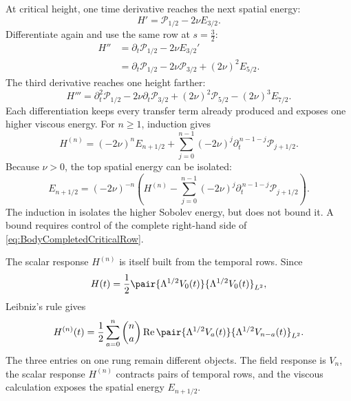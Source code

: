 At critical height, one time derivative reaches the next spatial energy:
\[
  H'=\mathcal P_{1/2}-2\nu E_{3/2}.
\]
Differentiate again and use the same row at \(s=\tfrac32\):
\[
\begin{aligned}
  H''
  &=\partial_t\mathcal P_{1/2}-2\nu E_{3/2}'
  \\
  &=\partial_t\mathcal P_{1/2}
  -2\nu\mathcal P_{3/2}
  +(2\nu)^2E_{5/2}.
\end{aligned}
\]
The third derivative reaches one height farther:
\[
  H'''
  =\partial_t^2\mathcal P_{1/2}
  -2\nu\partial_t\mathcal P_{3/2}
  +(2\nu)^2\mathcal P_{5/2}
  -(2\nu)^3E_{7/2}.
\]
Each differentiation keeps every transfer term already produced and exposes one higher viscous energy.
For \(n\geq1\), induction gives
\begin{equation}\label{eq:BodyCriticalHeightSpatialAscent}
  H^{(n)}
  =(-2\nu)^nE_{n+1/2}
  +\sum_{j=0}^{n-1}
  (-2\nu)^j
  \partial_t^{\,n-1-j}\mathcal P_{j+1/2}.
\end{equation}
Because \(\nu>0\), the top spatial energy can be isolated:
\begin{equation}\label{eq:BodyCompletedCriticalRow}
  E_{n+1/2}
  =(-2\nu)^{-n}
  \left(
    H^{(n)}
    -\sum_{j=0}^{n-1}
      (-2\nu)^j
      \partial_t^{\,n-1-j}\mathcal P_{j+1/2}
  \right).
\end{equation}
The induction in  isolates the higher Sobolev energy, but does not bound it.
A bound requires control of the complete right-hand side of \eqref{eq:BodyCompletedCriticalRow}.

The scalar response \(H^{(n)}\) is itself built from the temporal rows.
Since
\[
  H(t)
  =\frac12
  \pair{\Lambda^{1/2}V_0(t)}
       {\Lambda^{1/2}V_0(t)}_{L^2},
\]
Leibniz's rule gives
\begin{equation}\label{eq:BodyHeightDerivativeTemporalContraction}
  H^{(n)}(t)
  =\frac12\sum_{a=0}^{n}\binom{n}{a}
  \operatorname{Re}
  \pair{\Lambda^{1/2}V_a(t)}
       {\Lambda^{1/2}V_{n-a}(t)}_{L^2}.
\end{equation}
The three entries on one rung remain different objects.
The field response is \(V_n\), the scalar response \(H^{(n)}\) contracts pairs of temporal rows, and the viscous calculation exposes the spatial energy \(E_{n+1/2}\).

